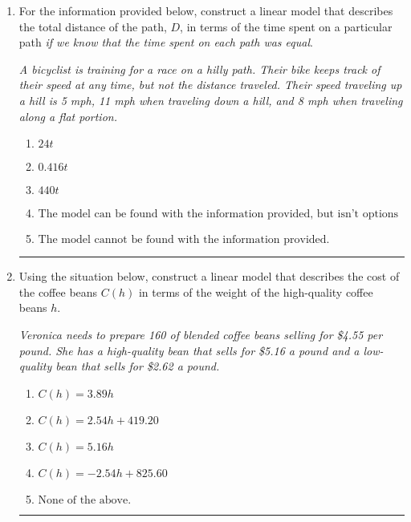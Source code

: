 \documentclass[14pt]{extbook}
\newcommand{\litem}[1]{\item#1\hspace*{-1cm}\rule{\textwidth}{0.4pt}}
\begin{document}
\begin{enumerate}
{\begin{enumerate}[label=\Alph*.]
\end{enumerate} }
\litem{
For the information provided below, construct a linear model that describes the total distance of the path, $D$, in terms of the time spent on a particular path \textit{if we know that the time spent on each path was equal}.
\begin{center}
    \textit{ A bicyclist is training for a race on a hilly path. Their bike keeps track of their speed at any time, but not the distance traveled. Their speed traveling up a hill is 5 mph, 11 mph when traveling down a hill, and 8 mph when traveling along a flat portion. }
\end{center}
\begin{enumerate}[label=\Alph*.]
\item \( 24 t \)
\item \( 0.416 t \)
\item \( 440 t \)
\item \( \text{The model can be found with the information provided, but isn't options 1-3.} \)
\item \( \text{The model cannot be found with the information provided.} \)

\end{enumerate} }
\litem{
Using the situation below, construct a linear model that describes the cost of the coffee beans $C(h)$ in terms of the weight of the high-quality coffee beans $h$.
\begin{center}
    \textit{ Veronica needs to prepare 160 of blended coffee beans selling for \$4.55 per pound. She has a high-quality bean that sells for \$5.16 a pound and a low-quality bean that sells for \$2.62 a pound. }
\end{center}
\begin{enumerate}[label=\Alph*.]
\item \( C(h) = 3.89 h \)
\item \( C(h) = 2.54 h + 419.20 \)
\item \( C(h) = 5.16 h \)
\item \( C(h) = -2.54 h + 825.60 \)
\item \( \text{None of the above.} \)


\end{enumerate}}
\end{enumerate}
\end{document}
